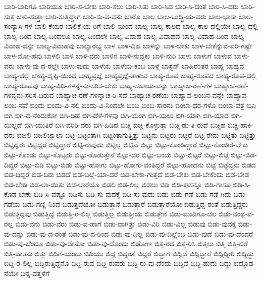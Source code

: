 {ಬಾರಿ-ಬಾರಿಗೂ
ಬಾರಿಯೂ
ಬಾರಿ-ಸ-ಬೇಕು
ಬಾರಿ-ಸಲು
ಬಾರಿ-ಸಿತು
ಬಾರಿ-ಸಿದ
ಬಾರಿ-ಸಿ-ದಂತೆ
ಬಾರಿ-ಸಿ-ದರು
ಬಾರಿ-ಸುತ್ತ
ಬಾರಿ-ಸುತ್ತಾ
ಬಾರಿ-ಸುತ್ತಿದ್ದಾಗ
ಬಾರಿ-ಸು-ವ-ವನು
ಬಾರೊ
ಬಾಲ
ಬಾಲ-ಬುದ್ಧಿ-ಯ-ವರು
ಬಾಲ-ಭಾಸಾ
ಬಾಲ-ಸಂನ್ಯಾಸಿ-ಗಳ
ಬಾಲಿ-ಕೆಯರ
ಬಾಲಿಕೆ-ಯ-ರಿಗೆ
ಬಾಲಿ-ಯಿಂದ
ಬಾಲ್ಯ
ಬಾಲ್ಯ-ಕಾಲದ
ಬಾಲ್ಯ-ಕಾಲ-ದಲ್ಲಿಯೇ
ಬಾಲ್ಯ-ದಲ್ಲಿ
ಬಾಲ್ಯ-ದಿಂದ
ಬಾಲ್ಯ-ದಿಂದಲೂ
ಬಾಲ್ಯ-ದಿಂದಲೇ
ಬಾಲ್ಯ-ವಿವಾಹ
ಬಾಲ್ಯ-ವಿವಾಹದ
ಬಾಲ್ಯ-ವಿವಾಹ-ದಿಂದ
ಬಾಲ್ಯ-ವಿವಾಹ-ವನ್ನು
ಬಾಲ್ಯ-ವಿವಾಹವು
ಬಾಲ್ಯಾರಭ್ಯ
ಬಾಳ
ಬಾಳ-ದಿಹ
ಬಾಳನ್ನು
ಬಾಳ-ಬೇಕು
ಬಾಳ-ಬೇಕೆನ್ನುವ-ವರಿ-ಗಷ್ಟೇ
ಬಾಳ-ಮೋ-ಹವು
ಬಾಳಲಿ
ಬಾಳಿ
ಬಾಳಿ-ದರು
ಬಾಳಿನ
ಬಾಳಿ-ನುದ್ದಕು
ಬಾಳಿ-ನುರಿ
ಬಾಳು
ಬಾಳುಗೆ
ಬಾಳುವ
ಬಾಳು-ವರು
ಬಾಳು-ವು-ದ-ರಲ್ಲೇ
ಬಾಳು-ವುದು
ಬಾಳೆಯ
ಬಾಳೆಯ-ಕಂಬ
ಬಾಳ್ಗೆ
ಬಾಸ್ಟನ್
ಬಾಹಿರಂತರ
ಬಾಹ್ಯ
ಬಾಹ್ಯದ
ಬಾಹ್ಯ-ದಲ್ಲಿ
ಬಾಹ್ಯ-ದೃಷ್ಟಿ-ಯಿಂದ
ಬಾಹ್ಯಪ್ರಜ್ಞೆ
ಬಾಹ್ಯಪ್ರಜ್ಞೆ-ತಾಳುವ
ಬಾಹ್ಯ-ರೂಪ
ಬಾಹ್ಯ-ರೂಪದ
ಬಾಹ್ಯ-ರೂಪ-ದಲ್ಲಿ
ಬಾಹ್ಯ-ರೂಪವು
ಬಾಹ್ಯ-ವಿಧಿ-ಗಳನ್ನ-ನು-ಸರಿಸ-ಬೇಕು
ಬಾಹ್ಯ-ಸಹಾಯ-ವನ್ನು
ಬಾಹ್ಯಾಚ-ರಣೆ-ಗಳ
ಬಾಹ್ಯಾಚ-ರಣೆ-ಗಳನ್ನನು-ಸರಿಸ-ದಿರುವ
ಬಾಹ್ಯಾಚ-ರಣೆ-ಗಳನ್ನಾಚ-ರಿ-ಸದೆ
ಬಾಹ್ಯಾಚ-ರಣೆಯ
ಬಾಹ್ಯಾವ-ಲಂಬನ-ವನ್ನೇ
ಬಾಹ್ಯಾವ-ಲಂಬ-ನವೆ
ಬಿಂದು
ಬಿಂದು-ವಿ-ನಲಿ
ಬಿಂದು-ವಿ-ನಿಂದಲೇ
ಬಿಂಬ
ಬಿಂಬ-ಸಾರನು
ಬಿಂಬಾ-ಧರ-ಗಳೊ
ಬಿಂಬಾ-ಪತ್ರ
ಬಿಎ
ಬಿಗಿ
ಬಿಗಿ-ದ-ನೆಂದುಕೋ
ಬಿಗಿ-ದಿಹ
ಬಿಗಿ-ದೆಳೆ-ಗಳವು
ಬಿಗಿ-ಯಂಗಿ
ಬಿಗಿ-ಯಲು
ಬಿಗಿ-ಯಾಗಿ
ಬಿಗಿ-ಯಾದ
ಬಿಗಿ-ಯಿಲ್ಲದೆ
ಬಿಗಿ-ಯುತಿರೆ
ಬಿಗಿ-ವರಿರಿ-ವರು
ಬಿಗಿ-ಹಿಡಿದ
ಬಿಚ್ಚಿ
ಬಿಚ್ಚಿ-ಕೊಳ್ಳುತ್ತಾ
ಬಿಚ್ಚಿ-ಡು-ತಿ-ರುವೆ
ಬಿಚ್ಚಿಹ
ಬಿಚ್ಚಿ-ಹಾಕಿ-ದರು
ಬಿಜಲಿ
ಬಿಜಲಿಜ್ವಾಲಾ
ಬಿಟ್ಟ
ಬಿಟ್ಟಂತಾಗಿ
ಬಿಟ್ಟಂತಾಗುತ್ತಿತ್ತು
ಬಿಟ್ಟನು
ಬಿಟ್ಟರು
ಬಿಟ್ಟರೆ
ಬಿಟ್ಟ-ರೇನು
ಬಿಟ್ಟಿತು
ಬಿಟ್ಟಿತ್ತು
ಬಿಟ್ಟಿದ್ದರು
ಬಿಟ್ಟಿದ್ದರೆ
ಬಿಟ್ಟಿದ್ದಾರೆ
ಬಿಟ್ಟಿ-ರುವುದು
ಬಿಟ್ಟಿಲ್ಲ
ಬಿಟ್ಟಿವೆ
ಬಿಟ್ಟು
ಬಿಟ್ಟು-ಕೊಂಡಿದ್ದಾರೆ
ಬಿಟ್ಟು-ಕೊಂಡಿರ-ಬೇಕು
ಬಿಟ್ಟು-ಕೊಂಡು
ಬಿಟ್ಟು-ಕೊಟ್ಟರು
ಬಿಟ್ಟು-ಕೊಡುತ್ತೇನೆ
ಬಿಟ್ಟು-ದರ
ಬಿಟ್ಟು-ಬಂದು
ಬಿಟ್ಟು-ಬಿಟ್ಟರೆ
ಬಿಟ್ಟು-ಬಿಟ್ಟೆ
ಬಿಟ್ಟು-ಬಿಡ-ದಿದ್ದರೆ
ಬಿಟ್ಟು-ಬಿಡಿ
ಬಿಟ್ಟು-ಬಿಡು
ಬಿಟ್ಟು-ಹೋಗು
ಬಿಟ್ಟು-ಹೋಗು-ವಂತಿದ್ದರೆ
ಬಿಟ್ಟು-ಹೋದನು
ಬಿಟ್ಟೆ
ಬಿಟ್ಟೆದ್ದನು
ಬಿಡದ
ಬಿಡ-ದಿದ್ದರೆ
ಬಿಡ-ದಿರು
ಬಿಡದೆ
ಬಿಡ-ಬಲ್ಲೆ-ಯಾ-ದರೆ
ಬಿಡ-ಬೇಕಾ-ಗುತ್ತದೆ
ಬಿಡ-ಬೇಕು
ಬಿಡ-ಬೇಕೆಂದು
ಬಿಡ-ಬೇಡ
ಬಿಡ-ಬೇಡಿ
ಬಿಡ-ಲಾ-ಯಿತು
ಬಿಡ-ಲಾರೆಯೊ
ಬಿಡಲಿ
ಬಿಡ-ಲಿಲ್ಲ
ಬಿಡಲು
ಬಿಡಿ
ಬಿಡಿ-ಕಾಸನ್ನೂ
ಬಿಡಿ-ಗಾಸೂ
ಬಿಡಿ-ಸಿ-ಕೊಡ-ಬೇಕು
ಬಿಡಿ-ಸಿ-ದಷ್ಟೂ
ಬಿಡಿಸು
ಬಿಡಿ-ಸು-ವುದಕ್ಕೆ
ಬಿಡಿ-ಸು-ವುದು
ಬಿಡು
ಬಿಡು-ಗಡೆ
ಬಿಡು-ಗಡೆ-ಗಿದು
ಬಿಡು-ಗಡೆಯ
ಬಿಡು-ಗಣ್ಣಿ-ನಿಂದ
ಬಿಡುತ್ತದೆಯೋ
ಬಿಡುತ್ತಾನೆ
ಬಿಡುತ್ತಾರೆ
ಬಿಡುತ್ತಾರೆಯೋ
ಬಿಡುತ್ತಿದ್ದ-ರಂತೆ
ಬಿಡುತ್ತಿದ್ದರು
ಬಿಡುತ್ತಿದ್ದವು
ಬಿಡುತ್ತಿದ್ದೆ
ಬಿಡುತ್ತಿ-ರ-ಲಿಲ್ಲ
ಬಿಡುತ್ತಿಲ್ಲ
ಬಿಡುತ್ತೀಯೆ
ಬಿಡುತ್ತೇನೆ
ಬಿಡು-ಮುಡಿಗೂ-ದಲ
ಬಿಡು-ವಂಥ-ವ-ರಲ್ಲ
ಬಿಡು-ವನು
ಬಿಡು-ವರು
ಬಿಡು-ವ-ಹಾಗೆ
ಬಿಡು-ವಾಗಿತ್ತು
ಬಿಡು-ವಿರಿ
ಬಿಡು-ವಿಲ್ಲ
ಬಿಡುವು
ಬಿಡು-ವುದಕ್ಕೆ
ಬಿಡು-ವು-ದನ್ನು
ಬಿಡು-ವು-ದ-ರಂತೆ
ಬಿಡು-ವು-ದ-ರಿಂದ
ಬಿಡು-ವು-ದಿಲ್ಲ
ಬಿಡು-ವು-ದಿಲ್ಲೆಂಬ
ಬಿಡು-ವುದೆ
ಬಿಡು-ವು-ದೆಂದರೆ
ಬಿಡು-ವು-ದೆಂದೂ
ಬಿಡು-ವು-ದೇನೋ
ಬಿಡು-ವು-ದೊಂದು
ಬಿಡೋಣ
ಬಿತ್ತ-ರದ
ಬಿತ್ತ-ರಿಸಿ
ಬಿತ್ತಲು
ಬಿತ್ತಿ
ಬಿತ್ತಿ-ದರೆ
ಬಿತ್ತಿ-ದಾತನು
ಬಿತ್ತು
ಬಿದಿಗೆ-ಯಂದು
ಬಿದಿಯು
ಬಿದ್ದ
ಬಿದ್ದಂತೆ
ಬಿದ್ದರೆ
ಬಿದ್ದಾಗ
ಬಿದ್ದಿದೆ
ಬಿದ್ದಿದ್ದಾರೆ
ಬಿದ್ದಿದ್ದೀರಿ
ಬಿದ್ದಿದ್ದು
ಬಿದ್ದಿ-ರ-ಲಿಲ್ಲ
ಬಿದ್ದಿರುತ್ತಿದ್ದೆನೊ
ಬಿದ್ದಿ-ರುವ
ಬಿದ್ದಿ-ರುವರು
ಬಿದ್ದಿ-ರು-ವು-ದೆಂದು
ಬಿದ್ದಿವೆ
ಬಿದ್ದಿ-ಹುದು
ಬಿದ್ದು
ಬಿದ್ದೊಡ-ನೆಯೇ
ಬಿನ್ನ-ವತ್ತಳೆಗೆ
}
